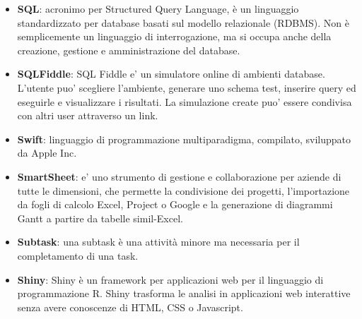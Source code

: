 \begin{itemize}
	\item \textbf{SQL}: acronimo per Structured Query Language, è un linguaggio standardizzato per database basati sul modello relazionale (RDBMS). Non è semplicemente un linguaggio di interrogazione, ma si occupa anche della creazione, gestione e amministrazione del database.
	\item \textbf{SQLFiddle}: SQL Fiddle e' un simulatore online di ambienti database. L'utente puo' scegliere l'ambiente, generare uno schema test, inserire query ed eseguirle e visualizzare i risultati. La simulazione create puo' essere condivisa con altri user attraverso un link.
	\item \textbf{Swift}: linguaggio di programmazione multiparadigma, compilato, sviluppato da Apple Inc.
	\item \textbf{SmartSheet}: e' uno strumento di gestione e collaborazione per aziende di tutte le dimensioni, che permette la condivisione dei progetti, l'importazione da fogli di calcolo Excel, Project o Google e la generazione di diagrammi Gantt a partire da tabelle simil-Excel.
	\item \textbf{Subtask}: una subtask è una attività minore ma necessaria per il completamento di una task.  
	\item \textbf{Shiny}: Shiny è un framework per applicazioni web per il linguaggio di programmazione R. Shiny trasforma le analisi in applicazioni web interattive senza avere conoscenze di HTML, CSS o Javascript.
\end{itemize}